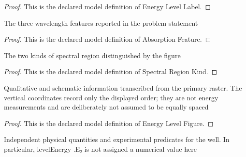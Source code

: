 \begin{proof}
  This is the declared model definition of Energy Level Label.
\end{proof}
\begin{definition}
  \label{def:physics:phyx-mini-0586:phyxminiproblems-problemphyxmini0586-absorptionfeature}
  The three wavelength features reported in the problem statement
\end{definition}
\begin{proof}
  This is the declared model definition of Absorption Feature.
\end{proof}
\begin{definition}
  \label{def:physics:phyx-mini-0586:phyxminiproblems-problemphyxmini0586-spectralregionkind}
  The two kinds of spectral region distinguished by the figure
\end{definition}
\begin{proof}
  This is the declared model definition of Spectral Region Kind.
\end{proof}
\begin{definition}
  \label{def:physics:phyx-mini-0586:phyxminiproblems-problemphyxmini0586-energylevelfigure}
  Qualitative and schematic information transcribed from the primary raster. The vertical coordinates record only the displayed order; they are not energy measurements and are deliberately not assumed to be equally spaced
\end{definition}
\begin{proof}
  This is the declared model definition of Energy Level Figure.
\end{proof}
\begin{definition}
  \label{def:physics:phyx-mini-0586:phyxminiproblems-problemphyxmini0586-finitewellabsorptionsetup}
  Independent physical quantities and experimental predicates for the well. In particular, levelEnergy .E₂ is not assigned a numerical value here
\end{definition}
